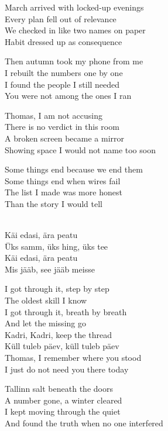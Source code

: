 \begin{lyrics}
March arrived with locked-up evenings\\
Every plan fell out of relevance\\
We checked in like two names on paper\\
Habit dressed up as consequence

Then autumn took my phone from me\\
I rebuilt the numbers one by one\\
I found the people I still needed\\
You were not among the ones I ran

Thomas, I am not accusing\\
There is no verdict in this room\\
A broken screen became a mirror\\
Showing space I would not name too soon

Some things end because we end them\\
Some things end when wires fail\\
The list I made was more honest\\
Than the story I would tell

\\
Käi edasi, ära peatu\\
Üks samm, üks hing, üks tee\\
Käi edasi, ära peatu\\
Mis jääb, see jääb meisse

I got through it, step by step\\
The oldest skill I know\\
I got through it, breath by breath\\
And let the missing go\\
Kadri, Kadri, keep the thread\\
Küll tuleb päev, küll tuleb päev\\
Thomas, I remember where you stood\\
I just do not need you there today

Tallinn salt beneath the doors\\
A number gone, a winter cleared\\
I kept moving through the quiet\\
And found the truth when no one interfered
\end{lyrics}

